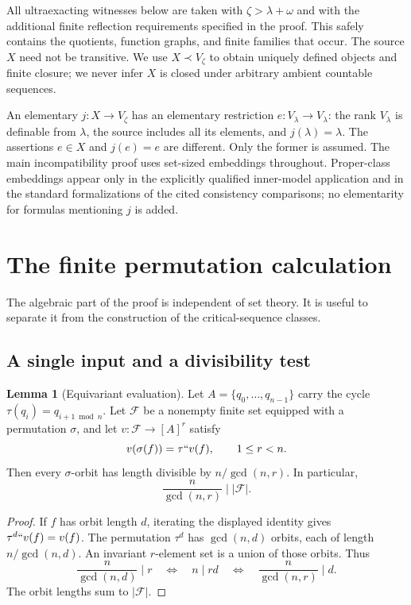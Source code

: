 \documentclass[11pt,letterpaper]{article}
\theoremstyle{definition}
\newtheorem{lemma}[definition]{Lemma}
\newcommand{\FF}{\mathscr F}
\begin{document}
All ultraexacting witnesses below are taken with $\zeta>\lambda+\omega$ and with the additional finite reflection requirements specified in the proof. This safely contains the quotients, function graphs, and finite families that occur. The source $X$ need not be transitive. We use $X\prec V_\zeta$ to obtain uniquely defined objects and finite closure; we never infer $X$ is closed under arbitrary ambient countable sequences.

An elementary $j:X\to V_\zeta$ has an elementary restriction $e:V_\lambda\to V_\lambda$: the rank $V_\lambda$ is definable from $\lambda$, the source includes all its elements, and $j(\lambda)=\lambda$. The assertions $e\in X$ and $j(e)=e$ are different. Only the former is assumed. The main incompatibility proof uses set-sized embeddings throughout. Proper-class embeddings appear only in the explicitly qualified inner-model application and in the standard formalizations of the cited consistency comparisons; no elementarity for formulas mentioning $j$ is added.

\section{The finite permutation calculation}\label{sec:finite}

The algebraic part of the proof is independent of set theory. It is useful to separate it from the construction of the critical-sequence classes.

\subsection{A single input and a divisibility test}

\begin{lemma}[Equivariant evaluation]\label{lem:divisibility}
Let $A=\{q_0,\ldots,q_{n-1}\}$ carry the cycle $\tau(q_i)=q_{i+1\bmod n}$. Let $\FF$ be a nonempty finite set equipped with a permutation $\sigma$, and let $v:\FF\to[A]^r$ satisfy
\[
 v(\sigma(f))=\tau``v(f),\qquad 1\leq r<n.
\]
Then every $\sigma$-orbit has length divisible by $n/\gcd(n,r)$. In particular,
\[
 \frac{n}{\gcd(n,r)}\mid |\FF|.
\]
\end{lemma}

\begin{proof}
If $f$ has orbit length $d$, iterating the displayed identity gives
$\tau^d``v(f)=v(f)$. The permutation $\tau^d$ has $\gcd(n,d)$ orbits, each of length $n/\gcd(n,d)$. An invariant $r$-element set is a union of those orbits. Thus
\[
 \frac{n}{\gcd(n,d)}\mid r
 \quad\Longleftrightarrow\quad n\mid rd
 \quad\Longleftrightarrow\quad \frac{n}{\gcd(n,r)}\mid d.
\]
The orbit lengths sum to $|\FF|$.
\end{proof}
\end{document}
